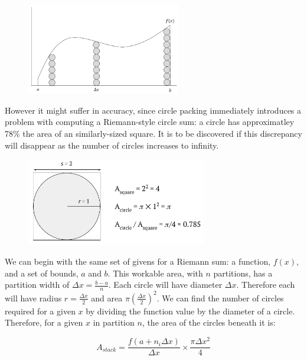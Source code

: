 \documentclass[12pt]{article}
\begin{document}
        \begin{figure}[!h]
          \centering
          \includegraphics[width=0.6\textwidth]{circle_example_1}
        \end{figure}

        However it might suffer in accuracy, since circle packing immediately introduces a problem with computing a Riemann-style circle sum: a circle has approximatley 78\% the area of an similarly-sized square. It is to be discovered if this discrepancy will disappear as the number of circles increases to infinity.

        \begin{figure}[h]
          \centering
          \includegraphics[width=0.7\textwidth]{circle_packing}
        \end{figure}

        We can begin with the same set of givens for a Riemann sum: a function, \( f(x) \), and a set of bounds, \( a \) and \( b \). This workable area, with \( n \) partitions, has a partition width of \( \Delta x = \frac{b-a}{n} \). Each circle will have diameter \( \Delta x \). Therefore each will have radius \( r = \frac{\Delta x}{2} \) and area \( \pi \left(\frac{\Delta x}{2}\right)^2 \). We can find the number of circles required for a given \( x \) by dividing the function value by the diameter of a circle. Therefore, for a given \( x \) in partition \( n \), the area of the circles beneath it is:

        \[ A_{stack} = \frac{f(a+n_i\Delta x)}{\Delta x} \times \frac{\pi \Delta x^2}{4} \]
\end{document}

